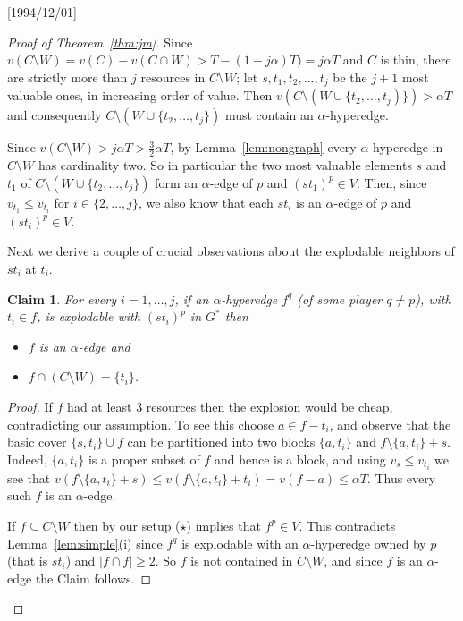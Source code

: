 \NeedsTeXFormat{LaTeX2e}[1994/12/01]\documentclass[letterpaper, 11pt]{article}
\newtheorem*{claim}{Claim}
\theoremstyle{definition}
\theoremstyle{remark}
\numberwithin{equation}{section}
\begin{document}
  \begin{proof}[Proof of Theorem~\ref{thm:jm}]
    
Since $v(C\setminus W) = v(C) - v(C\cap W) > T - (1-j\alpha)T) = j\alpha T$ and $C$ is thin,
there are strictly more than $j$ resources in $C\setminus W$; let  
$s,t_1,t_2,\ldots,t_j$ be the $j+1$ most valuable ones, in increasing
order of value.
Then  $v(C\setminus (W\cup\{t_2,\ldots,t_j)\})>\alpha T$ and consequently
$C\setminus(W\cup \{t_2,\ldots,t_j\})$ must contain an
$\alpha$-hyperedge.

Since $v(C\setminus W) > j\alpha T >\frac{3}{2}\alpha T$, by
Lemma~\ref{lem:nongraph} every $\alpha$-hyperedge in $C\setminus W$
has cardinality two. So in particular the two most valuable elements
$s$ and $t_1$ of $C\setminus(W\cup \{t_2,\ldots,t_j\})$ form an
$\alpha$-edge of $p$ and $(st_1)^p \in V$.
Then, since 
$v_{t_1}\leq v_{t_i}$ for $i\in\{2,\ldots,j\}$, we also know that each $st_i$ is an
$\alpha$-edge of $p$ and $(st_i)^p \in V$.

Next we derive a couple of crucial observations about the explodable neighbors of
$st_i$ at $t_i$.
\begin{claim}
  For every $i = 1, \ldots , j$, if an
$\alpha$-hyperedge $f^q$ (of some player $q\neq p$), with $t_i\in
f$, is explodable with
$(st_i)^p$ in $G^*$ then
\begin{itemize}
\item $f$ is an $\alpha$-edge and
\item $f\cap (C\setminus W) = \{ t_i \}$.
\end{itemize}
\end{claim}
\begin{proof}
If $f$ had at least 3 resources then the explosion would be cheap, contradicting our assumption.
To see this choose $a\in f - t_i$, and observe that the basic cover
$\{ s, t_i \}\cup f$ can be partitioned into two blocks  $\{a,t_i\}$ and
$f\setminus\{a,t_i\}+s$.
Indeed, $\{a,t_i\}$ is a proper subset
of $f$ and hence is a block, and using $v_s\leq v_{t_i}$ we see that
$v(f\setminus\{a,t_i\}+s)\leq v(f\setminus\{a,t_i\}+t_i)=v(f-a)\leq \alpha T$. 
Thus every such $f$ is an $\alpha$-edge.

If $f\subseteq C\setminus W$ then by our setup ($\star$) implies that $f^p\in V$. This
contradicts Lemma~\ref{lem:simple}(i) since $f^q$ is explodable with an
$\alpha$-hyperedge owned by $p$ (that is $st_i$) and $|f\cap f| \geq
2$. So $f$ is not contained in $C\setminus W$, and since $f$ is an $\alpha$-edge the Claim follows.
\end{proof}


\end{proof}
\end{document}
